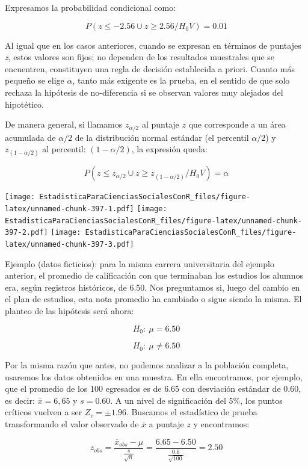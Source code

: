 \documentclass[]{book}
\begin{document}
Expresamos la probabilidad condicional como:

\[P(z\leq -2.56 \cup z\geq 2.56 / H_{0} V)=0.01\]

Al igual que en los casos anteriores, cuando se expresan en términos de
puntajes \emph{z}, estos valores son fijos; no dependen de los resultados
muestrales que se encuentren, constituyen una regla de decisión
establecida a priori. Cuanto más pequeño se elige \(\alpha\), tanto más exigente
es la prueba, en el sentido de que solo rechaza la hipótesis de
no-diferencia si se observan valores muy alejados del hipotético.

De manera general, si llamamos \(z_{\alpha/2}\) al puntaje \(z\) que corresponde a un área acumulada de \(\alpha/2\) de la distribución normal estándar (el percentil \(\alpha/2\)) y \(z_{(1-\alpha/2)}\) al percentil: \((1-\alpha/2)\), la expresión queda:

\[P(z\leq z_{\alpha/2} \cup z\geq z_{(1-\alpha/2)} / H_{0} V)=\alpha \]

\texttt{[image: EstadisticaParaCienciasSocialesConR\_files/figure-latex/unnamed-chunk-397-1.pdf]} \texttt{[image: EstadisticaParaCienciasSocialesConR\_files/figure-latex/unnamed-chunk-397-2.pdf]} \texttt{[image: EstadisticaParaCienciasSocialesConR\_files/figure-latex/unnamed-chunk-397-3.pdf]}

Ejemplo (datos ficticios): para la misma carrera universitaria del
ejemplo anterior, el promedio de calificación con que terminaban los
estudios los alumnos era, según registros históricos, de 6.50. Nos
preguntamos si, luego del cambio en el plan de estudios, esta nota
promedio ha cambiado o sigue siendo la misma. El planteo de las
hipótesis será ahora:

\[H_{0}:\ \mu = 6.50\]

\[H_{0}:\ \mu \neq 6.50\]

Por la misma razón que antes, no podemos analizar a la población
completa, usaremos los datos obtenidos en una muestra. En ella
encontramos, por ejemplo, que el promedio de los 100 egresados es de
6.65 con desviación estándar de 0.60, es decir:
\(\overline{x} = 6,65\) y \(s = 0.60\). A un nivel de significación del 5\%,
los puntos críticos vuelven a ser \(Z_{c}=\pm1.96\). Buscamos el
estadístico de prueba transformando el valor observado de \(\overline{x}\) a puntaje \(z\) y encontramos:

\[z_{obs} = \frac{{\overline{x}}_{obs} - \mu}{\frac{s}{\sqrt{n}}} = \frac{6.65 - 6.50}{\frac{0.6}{\sqrt{100}}} = 2.50\]
\end{document}
